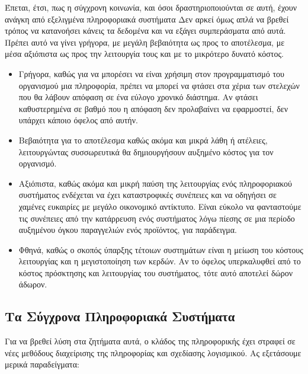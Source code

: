 \documentclass{article}
\begin{document}
Έπεται, έτσι, πως η σύγχρονη κοινωνία, και όσοι δραστηριοποιούνται σε αυτή, έχουν ανάγκη από εξελιγμένα πληροφοριακά συστήματα
Δεν αρκεί όμως απλά  να βρεθεί τρόπος να κατανοήσει κάνεις τα δεδομένα και να εξάγει συμπεράσματα από αυτά. Πρέπει αυτό να γίνει γρήγορα, με μεγάλη βεβαιότητα ως προς το αποτέλεσμα, με μέσα αξιόπιστα ως προς την λειτουργία τους και με το μικρότερο δυνατό κόστος.


\begin{itemize}
\item Γρήγορα, καθώς για να μπορέσει να είναι χρήσιμη στον προγραμματισμό του οργανισμού μια πληροφορία, πρέπει να μπορεί να φτάσει στα χέρια των στελεχών που θα λάβουν απόφαση σε ένα εύλογο χρονικό διάστημα. Αν φτάσει καθυστερημένα σε βαθμό που η απόφαση δεν προλαβαίνει να εφαρμοστεί, δεν υπάρχει κάποιο όφελος από αυτήν.
\item Βεβαιότητα για το αποτέλεσμα καθώς ακόμα και μικρά λάθη ή ατέλειες, λειτουργώντας συσσωρευτικά θα δημιουργήσουν αυξημένο κόστος για τον οργανισμό.
\item Αξιόπιστα, καθώς ακόμα και μικρή παύση της λειτουργίας ενός πληροφοριακού συστήματος ενδέχεται να έχει καταστροφικές συνέπειες και να οδηγήσει σε χαμένες ευκαιρίες με μεγάλο οικονομικό αντίκτυπο. Είναι εύκολο να φανταστούμε τις συνέπειες από την κατάρρευση ενός συστήματος λόγω πίεσης σε μια περίοδο αυξημένου όγκου παραγγελιών ενός προϊόντος, για παράδειγμα.
\item Φθηνά, καθώς ο σκοπός ύπαρξης τέτοιων συστημάτων είναι η μείωση του κόστους λειτουργίας και η μεγιστοποίηση των κερδών. Αν το όφελος υπερκαλυφθεί από το κόστος πρόσκτησης και λειτουργίας του συστήματος, τότε αυτό αποτελεί δώρον άδωρον.
\end{itemize}

\subsection{Τα Σύγχρονα Πληροφοριακά Συστήματα}
Για να βρεθεί λύση στα ζητήματα αυτά, ο κλάδος της πληροφορικής έχει στραφεί σε νέες  μεθόδους διαχείρισης της πληροφορίας και σχεδίασης λογισμικού. Ας εξετάσουμε μερικά παραδείγματα:
\end{document}
